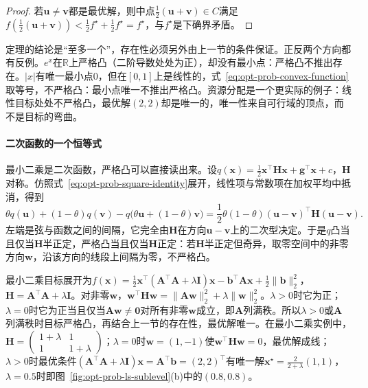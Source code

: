 \begin{proof}
若$\bm u\neq\bm v$都是最优解，则中点$\frac12(\bm u+\bm v)\in C$满足$f(\frac12(\bm u+\bm v))<\frac12f^\star+\frac12f^\star=f^\star$，与$f^\star$是下确界矛盾。
\end{proof}

定理的结论是“至多一个”，存在性必须另外由上一节的条件保证。正反两个方向都有反例。$e^x$在$\mathbb R$上严格凸（二阶导数处处为正），却没有最小点：严格凸不推出存在。$|x|$有唯一最小点$0$，但在$[0,1]$上是线性的，式~\eqref{eq:opt-prob-convex-function}取等号，不严格凸：最小点唯一不推出严格凸。资源分配是一个更实际的例子：线性目标处处不严格凸，最优解$(2,2)$却是唯一的，唯一性来自可行域的顶点，而不是目标的弯曲。

\paragraph{二次函数的一个恒等式}
最小二乘是二次函数，严格凸可以直接读出来。设$q(\bm x)=\frac12\bm x^\top\bm H\bm x+\bm g^\top\bm x+c$，$\bm H$对称。仿照式~\eqref{eq:opt-prob-square-identity}展开，线性项与常数项在加权平均中抵消，得到
\begin{equation}
  \theta q(\bm u)+(1-\theta)q(\bm v)-q\bigl(\theta\bm u+(1-\theta)\bm v\bigr)=\frac12\theta(1-\theta)(\bm u-\bm v)^\top\bm H(\bm u-\bm v).
  \label{eq:opt-prob-quadratic-identity}
\end{equation}
左端是弦与函数之间的间隔，它完全由$\bm H$在方向$\bm u-\bm v$上的二次型决定。于是$q$凸当且仅当$\bm H$半正定，严格凸当且仅当$\bm H$正定：若$\bm H$半正定但奇异，取零空间中的非零方向$\bm w$，沿该方向的线段上间隔为零，不严格凸。

最小二乘目标展开为$f(\bm x)=\frac12\bm x^\top(\bm A^\top\bm A+\lambda\bm I)\bm x-\bm b^\top\bm A\bm x+\frac12\lVert\bm b\rVert_2^2$，$\bm H=\bm A^\top\bm A+\lambda\bm I$。对非零$\bm w$，$\bm w^\top\bm H\bm w=\lVert\bm A\bm w\rVert_2^2+\lambda\lVert\bm w\rVert_2^2$。$\lambda>0$时它为正；$\lambda=0$时它为正当且仅当$\bm A\bm w\neq\bm 0$对所有非零$\bm w$成立，即$\bm A$列满秩。所以$\lambda>0$或$\bm A$列满秩时目标严格凸，再结合上一节的存在性，最优解唯一。在最小二乘实例中，$\bm H=\begin{pmatrix}1+\lambda&1\\1&1+\lambda\end{pmatrix}$；$\lambda=0$时$\bm w=(1,-1)$使$\bm w^\top\bm H\bm w=0$，最优解成线；$\lambda>0$时最优条件$(\bm A^\top\bm A+\lambda\bm I)\bm x=\bm A^\top\bm b=(2,2)^\top$有唯一解$\bm x^\star=\frac{2}{2+\lambda}(1,1)$，$\lambda=0.5$时即图~\ref{fig:opt-prob-ls-sublevel}(b)中的$(0.8,0.8)$。

